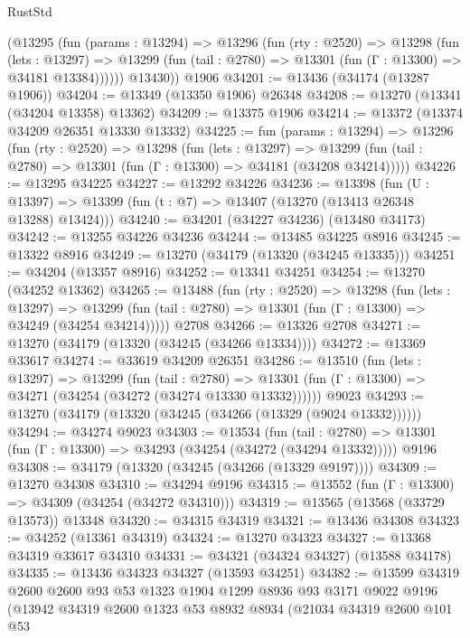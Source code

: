 \begin{lexlean}{RustStd}
\begin{coremodule}
        (@13295
          (fun (params : @13294) =>
          @13296
            (fun (rty : @2520) =>
            @13298
              (fun (lets : @13297) =>
              @13299 (fun (tail : @2780) => @13301 (fun (Γ : @13300) => @34181 @13384))))))
        @13430))
    @1906
@34201 := @13436 (@34174 (@13287 @1906))
@34204 := @13349 (@13350 @1906) @26348
@34208 := @13270 (@13341 (@34204 @13358) @13362)
@34209 := @13375 @1906
@34214 := @13372 (@13374 @34209 @26351 @13330 @13332)
@34225 := fun (params : @13294) =>
  @13296
    (fun (rty : @2520) =>
    @13298
      (fun (lets : @13297) =>
      @13299 (fun (tail : @2780) => @13301 (fun (Γ : @13300) => @34181 (@34208 @34214)))))
@34226 := @13295 @34225
@34227 := @13292 @34226
@34236 := @13398
    (fun (U : @13397) => @13399 (fun (t : @7) => @13407 (@13270 (@13413 @26348 @13288) @13424)))
@34240 := @34201 (@34227 @34236) (@13480 @34173)
@34242 := @13255 @34226 @34236
@34244 := @13485 @34225 @8916
@34245 := @13322 @8916
@34249 := @13270 (@34179 (@13320 (@34245 @13335)))
@34251 := @34204 (@13357 @8916)
@34252 := @13341 @34251
@34254 := @13270 (@34252 @13362)
@34265 := @13488
    (fun (rty : @2520) =>
    @13298
      (fun (lets : @13297) =>
      @13299 (fun (tail : @2780) => @13301 (fun (Γ : @13300) => @34249 (@34254 @34214)))))
    @2708
@34266 := @13326 @2708
@34271 := @13270 (@34179 (@13320 (@34245 (@34266 @13334))))
@34272 := @13369 @33617
@34274 := @33619 @34209 @26351
@34286 := @13510
    (fun (lets : @13297) =>
    @13299
      (fun (tail : @2780) =>
      @13301 (fun (Γ : @13300) => @34271 (@34254 (@34272 (@34274 @13330 @13332))))))
    @9023
@34293 := @13270 (@34179 (@13320 (@34245 (@34266 (@13329 (@9024 @13332))))))
@34294 := @34274 @9023
@34303 := @13534
    (fun (tail : @2780) => @13301 (fun (Γ : @13300) => @34293 (@34254 (@34272 (@34294 @13332)))))
    @9196
@34308 := @34179 (@13320 (@34245 (@34266 (@13329 @9197))))
@34309 := @13270 @34308
@34310 := @34294 @9196
@34315 := @13552 (fun (Γ : @13300) => @34309 (@34254 (@34272 @34310)))
@34319 := @13565 (@13568 (@33729 @13573)) @13348
@34320 := @34315 @34319
@34321 := @13436 @34308
@34323 := @34252 (@13361 @34319)
@34324 := @13270 @34323
@34327 := @13368 @34319 @33617 @34310
@34331 := @34321 (@34324 @34327) (@13588 @34178)
@34335 := @13436 @34323 @34327 (@13593 @34251)
@34382 := @13599
    @34319
    @2600
    @2600
    @93
    @53
    @1323
    @1904
    @1299
    @8936
    @93
    @3171
    @9022
    @9196
    (@13942
      @34319
      @2600
      @1323
      @53
      @8932
      @8934
      (@21034
        @34319
        @2600
        @101
        @53

\end{coremodule}
\end{lexlean}
